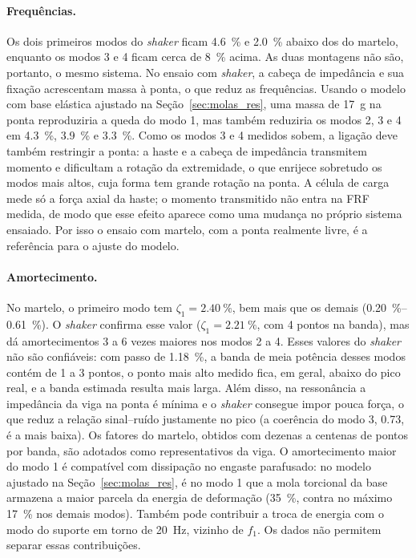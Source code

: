 \paragraph{Frequências.} Os dois primeiros modos do \emph{shaker} ficam
\SI{4.6}{\percent} e \SI{2.0}{\percent} abaixo dos do martelo, enquanto os modos 3 e 4
ficam cerca de \SI{8}{\percent} acima. As duas montagens não são, portanto, o mesmo
sistema. No ensaio com \emph{shaker}, a cabeça de impedância e sua fixação acrescentam
massa à ponta, o que reduz as frequências. Usando o modelo com base elástica ajustado
na Seção~\ref{sec:molas_res}, uma massa de \SI{17}{\gram} na ponta reproduziria a
queda do modo 1, mas também reduziria os modos 2, 3 e 4 em \SI{4.3}{\percent},
\SI{3.9}{\percent} e \SI{3.3}{\percent}. Como os modos 3 e 4 medidos sobem, a ligação
deve também restringir a ponta: a haste e a cabeça de impedância transmitem momento e
dificultam a rotação da extremidade, o que enrijece sobretudo os modos mais altos,
cuja forma tem grande rotação na ponta. A célula de carga mede só a força axial da
haste; o momento transmitido não entra na FRF medida, de modo que esse efeito aparece
como uma mudança no próprio sistema ensaiado. Por isso o ensaio com martelo, com a
ponta realmente livre, é a referência para o ajuste do modelo.

\paragraph{Amortecimento.} No martelo, o primeiro modo tem
$\zeta_1 = \SI{2.40}{\percent}$, bem mais que os demais
(\SIrange{0.20}{0.61}{\percent}). O \emph{shaker} confirma esse valor
($\zeta_1 = \SI{2.21}{\percent}$, com 4 pontos na banda), mas dá amortecimentos 3 a 6
vezes maiores nos modos 2 a 4. Esses valores do \emph{shaker} não são confiáveis: com
passo de \SI{1.18}{\percent}, a banda de meia potência desses modos contém de 1 a 3
pontos, o ponto mais alto medido fica, em geral, abaixo do pico real, e a banda
estimada resulta mais larga. Além disso, na ressonância a impedância da viga na ponta
é mínima e o \emph{shaker} consegue impor pouca força, o que reduz a relação
sinal--ruído justamente no pico (a coerência do modo 3, \num{0.73}, é a mais baixa).
Os fatores do martelo, obtidos com dezenas a centenas de pontos por banda, são
adotados como representativos da viga. O amortecimento maior do modo 1 é compatível
com dissipação no engaste parafusado: no modelo ajustado na
Seção~\ref{sec:molas_res}, é no modo 1 que a mola torcional da base armazena a maior
parcela da energia de deformação (\SI{35}{\percent}, contra no máximo
\SI{17}{\percent} nos demais modos). Também pode contribuir a troca de energia com o
modo do suporte em torno de \SI{20}{\hertz}, vizinho de $f_1$. Os dados não permitem
separar essas contribuições.

